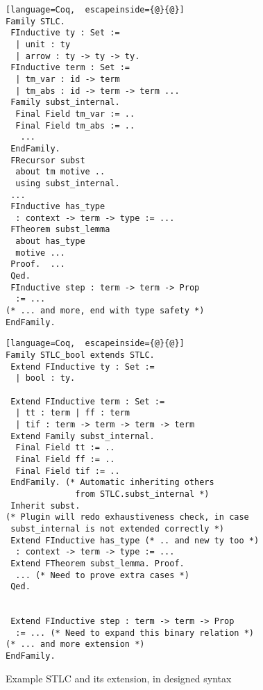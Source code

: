 \ifShowOldWriting

\begin{figure}
  \begin{minipage}[t]{0.47\linewidth}
\begin{lstlisting}[language=Coq,  escapeinside={@}{@}]
Family STLC.
 FInductive ty : Set :=
  | unit : ty
  | arrow : ty -> ty -> ty.
 FInductive term : Set := 
  | tm_var : id -> term 
  | tm_abs : id -> term -> term ...
 Family subst_internal.
  Final Field tm_var := ..
  Final Field tm_abs := ..
   ...
 EndFamily.
 FRecursor subst
  about tm motive ..
  using subst_internal.
 ...
 FInductive has_type 
  : context -> term -> type := ...
 FTheorem subst_lemma 
  about has_type 
  motive ...
 Proof.  ...
 Qed.
 FInductive step : term -> term -> Prop 
  := ...
(* ... and more, end with type safety *)
EndFamily.
\end{lstlisting}
  \end{minipage}
  \begin{minipage}[t]{0.47\linewidth}
\begin{lstlisting}[language=Coq,  escapeinside={@}{@}]
Family STLC_bool extends STLC.
 Extend FInductive ty : Set :=
  | bool : ty.

 Extend FInductive term : Set := 
  | tt : term | ff : term 
  | tif : term -> term -> term -> term
 Extend Family subst_internal.
  Final Field tt := ..
  Final Field ff := ..
  Final Field tif := ..
 EndFamily. (* Automatic inheriting others 
              from STLC.subst_internal *)
 Inherit subst.
(* Plugin will redo exhaustiveness check, in case 
 subst_internal is not extended correctly *)
 Extend FInductive has_type (* .. and new ty too *)
  : context -> term -> type := ...
 Extend FTheorem subst_lemma. Proof.
  ... (* Need to prove extra cases *)
 Qed.


 Extend FInductive step : term -> term -> Prop 
  := ... (* Need to expand this binary relation *)
(* ... and more extension *)
EndFamily.
\end{lstlisting}
  \end{minipage}
  \caption{Example STLC and its extension, in designed syntax}\label{fig:STLC-example2}
\end{figure}

\fi